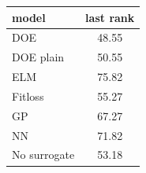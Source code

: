 \begin{tabular}{|lc|}
\hline
model & last rank\\
\hline
DOE & 48.55 \\
DOE plain & 50.55 \\
ELM & 75.82 \\
Fitloss & 55.27 \\
GP & 67.27 \\
NN & 71.82 \\
No surrogate & 53.18 \\
\hline
\end{tabular}
